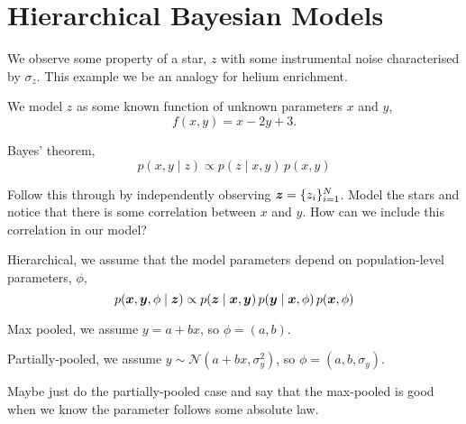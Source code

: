 %
%
%
%
%
\chapter{Hierarchical Bayesian Models}

We observe some property of a star, \(z\) with some instrumental noise characterised by \(\sigma_z\). This example we be an analogy for helium enrichment.

We model \(z\) as some known function of unknown parameters \(x\) and \(y\),
%
\begin{equation}
    f(x, y) = x - 2y + 3.
\end{equation}
%

Bayes' theorem,
%
\begin{equation}
    p(x, y \mid z) \propto p(z \mid x, y) \, p(x, y)
\end{equation}
%

Follow this through by independently observing \(\bm{z} = \{z_i\}_{i=1}^N\). Model the stars and notice that there is some correlation between \(x\) and \(y\). How can we include this correlation in our model?

Hierarchical, we assume that the model parameters depend on population-level parameters, \(\phi\),
%
\begin{equation}
    p(\bm{x}, \bm{y}, \phi \mid \bm{z}) \propto p(\bm{z} \mid \bm{x}, \bm{y}) \, p(\bm{y} \mid \bm{x}, \phi) \, p(\bm{x}, \phi)
\end{equation}
%

Max pooled, we assume \(y = a + bx\), so \(\phi = (a, b)\).

Partially-pooled, we assume \(y \sim \mathcal{N}(a + bx, \sigma_y^2)\), so \(\phi = (a, b, \sigma_y)\).

Maybe just do the partially-pooled case and say that the max-pooled is good when we know the parameter follows some absolute law.
